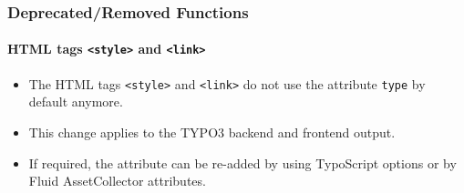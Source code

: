 %

\begin{frame}[fragile]
	\frametitle{Deprecated/Removed Functions}
	\framesubtitle{HTML tags \texttt{<style>} and \texttt{<link>}}

	\begin{itemize}
		\item The HTML tags \texttt{<style>} and \texttt{<link>} do not use the
			attribute \texttt{type} by default anymore.
		\item This change applies to the TYPO3 backend and frontend output.
		\item If required, the attribute can be re-added by using TypoScript options
			or by Fluid AssetCollector attributes.
	\end{itemize}

\end{frame}

